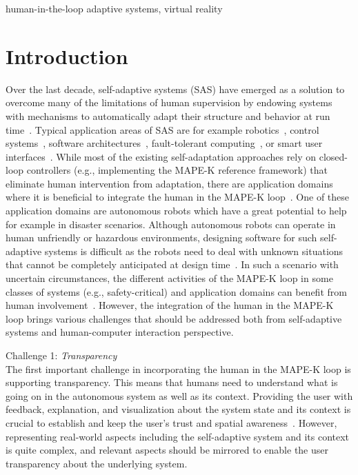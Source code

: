 \documentclass[10pt, conference]{IEEEtran}
\begin{document}
\begin{IEEEkeywords}
human-in-the-loop adaptive systems, virtual reality
\end{IEEEkeywords}

\section{Introduction}
\label{intro}
Over the last decade, self-adaptive systems (SAS) have emerged as a solution to overcome many of the limitations of human supervision by endowing systems with mechanisms to automatically adapt their structure and behavior at run time~\cite{seams15_human_participation}. Typical application areas of SAS are for example robotics~\cite{edwards2009architecture}, control systems~\cite{filieri2015software}, software architectures~\cite{DBLP:conf/models/NagelGYCE12}, fault-tolerant computing~\cite{ebnenasir2007designing}, or smart user interfaces~\cite{DBLP:conf/ecmdafa/YigitbasS0E17}. While most of the existing self-adaptation approaches rely on closed-loop controllers (e.g., implementing the MAPE-K reference framework) that eliminate human intervention from adaptation, there are application domains where it is beneficial to integrate the human in the MAPE-K loop~\cite{seams15_human_participation}. One of these application domains are autonomous robots which have a great potential to help for example in disaster scenarios. Although autonomous robots can operate in human unfriendly or hazardous environments, designing software for such self-adaptive systems is difficult as the robots need to deal with unknown situations that cannot be completely anticipated at design time~\cite{DBLP:conf/icse/NiemczykG15}. In such a scenario with uncertain circumstances, the different activities of the MAPE-K loop in some classes of systems (e.g., safety-critical) and application domains can benefit from human involvement~\cite{seams15_human_participation}. However, the integration of the human in the MAPE-K loop brings various challenges that should be addressed both from self-adaptive systems and human-computer interaction perspective.

Challenge 1: \textit{Transparency} \\
The first important challenge in incorporating the human in the MAPE-K loop is supporting transparency. This means that humans need to understand what is going on in the autonomous system as well as its context. Providing the user with feedback, explanation, and visualization about the system state and its context is crucial to establish and keep the user's trust and spatial awareness~\cite{seams16_designing_human_itl}. However, representing real-world aspects including the self-adaptive system and its context is quite complex, and relevant aspects should be mirrored to enable the user transparency about the underlying system.  
\end{document}
